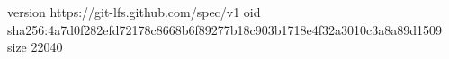 version https://git-lfs.github.com/spec/v1
oid sha256:4a7d0f282efd72178c8668b6f89277b18c903b1718e4f32a3010c3a8a89d1509
size 22040
